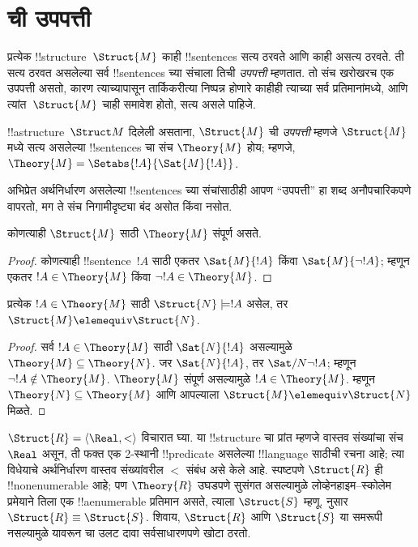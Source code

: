 \documentclass[../../../include/open-logic-section]{subfiles}
\begin{document}

\section{ ची उपपत्ती}

प्रत्येक !!{structure}~$\Struct{M}$ काही !!{sentence}s सत्य ठरवते आणि
काही असत्य ठरवते. ती सत्य ठरवत असलेल्या सर्व !!{sentence}s च्या संचाला
तिची \emph{उपपत्ती} म्हणतात. तो संच खरोखरच एक उपपत्ती असतो, कारण
त्याच्यापासून तार्किकरीत्या निष्पन्न होणारे काहीही त्याच्या सर्व
प्रतिमानांमध्ये, आणि त्यांत~$\Struct{M}$ चाही समावेश होतो, सत्य असले
पाहिजे.

\begin{defn}
  !!a{structure}~$\Struct M$ दिलेली असताना, $\Struct{M}$ ची
  \emph{उपपत्ती} म्हणजे $\Struct{M}$ मध्ये सत्य असलेल्या !!{sentence}s
  चा संच $\Theory{M}$ होय; म्हणजे, $\Theory{M} =
  \Setabs{!A}{\Sat{M}{!A}}$.
\end{defn}

अभिप्रेत अर्थनिर्धारण असलेल्या !!{sentence}s च्या संचांसाठीही आपण
``उपपत्ती'' हा शब्द अनौपचारिकपणे वापरतो, मग ते संच निगामीदृष्ट्या बंद
असोत किंवा नसोत.

\begin{prop}
कोणत्याही $\Struct{M}$ साठी $\Theory{M}$ संपूर्ण असते.
\end{prop}

\begin{proof}
कोणत्याही !!{sentence}~$!A$ साठी एकतर $\Sat{M}{!A}$ किंवा
$\Sat{M}{\lnot !A}$; म्हणून एकतर $!A \in \Theory{M}$ किंवा
$\lnot !A \in \Theory{M}$.
\end{proof}

\begin{prop}
  प्रत्येक $!A \in \Theory{M}$ साठी $\Struct{N} \models !A$ असेल,
  तर $\Struct{M} \elemequiv \Struct{N}$.
\end{prop}

\begin{proof}
सर्व $!A \in \Theory{M}$ साठी $\Sat{N}{!A}$ असल्यामुळे
$\Theory{M} \subseteq \Theory{N}$. जर $\Sat{N}{!A}$, तर
$\Sat/{N}{\lnot !A}$; म्हणून $\lnot !A \notin \Theory{M}$.
$\Theory{M}$ संपूर्ण असल्यामुळे $!A \in \Theory{M}$. म्हणून
$\Theory{N} \subseteq \Theory{M}$ आणि आपल्याला
$\Struct{M} \elemequiv \Struct{N}$ मिळते.
\end{proof}

\begin{rem}
  $\Struct{R} = \langle\Real, <\rangle$ विचारात घ्या. या
  !!{structure} चा प्रांत म्हणजे वास्तव संख्यांचा संच~$\Real$ असून,
  ती फक्त एक 2-स्थानी !!{predicate} असलेल्या !!{language} साठीची रचना
  आहे; त्या विधेयाचे अर्थनिर्धारण वास्तव संख्यांवरील $<$ संबंध असे केले
  आहे. स्पष्टपणे $\Struct{R}$ ही !!{nonenumerable} आहे; पण
  $\Theory{R}$ उघडपणे सुसंगत असल्यामुळे लोव्हेनहाइम--स्कोलेम प्रमेयाने
  तिला एक !!a{enumerable} प्रतिमान असते, त्याला $\Struct{S}$ म्हणू.
   नुसार $\Struct{R} \equiv \Struct{S}$. शिवाय,
  $\Struct{R}$ आणि $\Struct{S}$ या समरूपी नसल्यामुळे यावरून
   चा उलट दावा सर्वसाधारणपणे खोटा ठरतो.
\end{rem}
\end{document}
